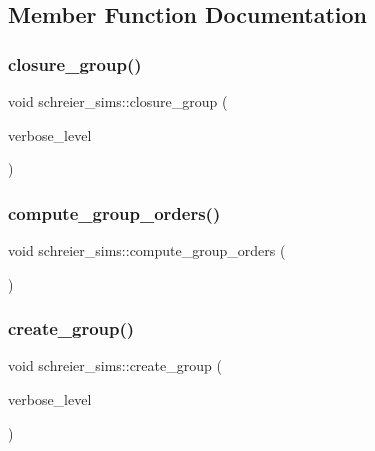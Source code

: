 \subsection{Member Function Documentation}
\mbox{\label{classschreier__sims_ab7b5e8db97b550983b0213f713365feb}} 
\subsubsection{\texorpdfstring{closure\+\_\+group()}{closure\_group()}}
{\footnotesize\ttfamily void schreier\+\_\+sims\+::closure\+\_\+group (\begin{DoxyParamCaption}\item[{\mbox{\hyperlink{galois_8h_a09fddde158a3a20bd2dcadb609de11dc}{I\+NT}}}]{verbose\+\_\+level }\end{DoxyParamCaption})}

\mbox{\label{classschreier__sims_a2a6c775290e7dd8fd4404816dcc23421}} 
\subsubsection{\texorpdfstring{compute\+\_\+group\+\_\+orders()}{compute\_group\_orders()}}
{\footnotesize\ttfamily void schreier\+\_\+sims\+::compute\+\_\+group\+\_\+orders (\begin{DoxyParamCaption}{ }\end{DoxyParamCaption})}

\mbox{\label{classschreier__sims_a1423aec8f5f7f69d0518cd4e69e29b07}} 
\subsubsection{\texorpdfstring{create\+\_\+group()}{create\_group()}}
{\footnotesize\ttfamily void schreier\+\_\+sims\+::create\+\_\+group (\begin{DoxyParamCaption}\item[{\mbox{\hyperlink{galois_8h_a09fddde158a3a20bd2dcadb609de11dc}{I\+NT}}}]{verbose\+\_\+level }\end{DoxyParamCaption})}

